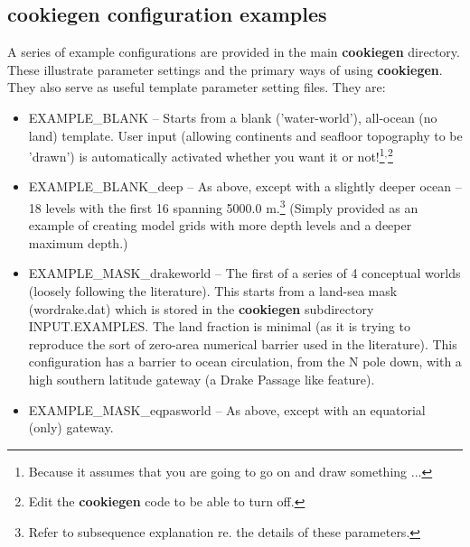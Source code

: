 
\subsection{cookiegen configuration examples}

A series of example configurations are provided in the main \textbf{cookiegen} directory. These illustrate parameter settings and the primary ways of using \textbf{cookiegen}. They also serve as useful template parameter setting files.  They are:

\vspace{1mm}
\begin{itemize}[noitemsep]

\vspace{1mm}
\item \textsf{\footnotesize EXAMPLE\_BLANK} -- Starts from a blank ('water-world'), all-ocean (no land) template. User input (allowing continents and seafloor topography to be 'drawn') is automatically activated whether you want it or not!\footnote{Because it assumes that you are going to go on and draw something ...}\(^{,}\)\footnote{Edit the \textbf{cookiegen} code to be able to turn off.}

\vspace{1mm}
\item \textsf{\footnotesize EXAMPLE\_BLANK\_deep} -- As above, except with a slightly deeper ocean -- 18 levels with the first 16 spanning 5000.0 m.\footnote{Refer to subsequence explanation re. the details of these parameters.} (Simply provided as an example of creating model grids with more depth levels and a deeper maximum depth.)

\vspace{1mm}
\item \textsf{\footnotesize EXAMPLE\_MASK\_drakeworld} -- The first of a series of 4 conceptual worlds (loosely following the literature). This starts from a land-sea mask (\footnotesize\textsf{wordrake.dat}\normalsize) which is stored in the \textbf{cookiegen} subdirectory \footnotesize\textsf{INPUT.EXAMPLES}\normalsize. The land fraction is minimal (as it is trying to reproduce the sort of zero-area numerical barrier used in the literature). This configuration has a barrier to ocean circulation, from the N pole down, with a high southern latitude gateway (a Drake Passage like feature).

\vspace{1mm}
\item \textsf{\footnotesize EXAMPLE\_MASK\_eqpasworld} -- As above, except with an equatorial (only) gateway.


\end{itemize}
